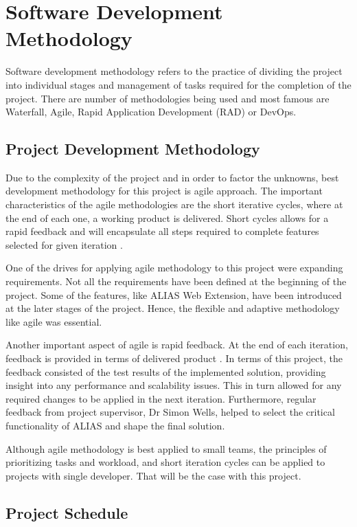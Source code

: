 \section{Software Development Methodology}
Software development methodology refers to the practice of dividing the project into individual stages and management of tasks required for the completion of the project. There are number of methodologies being used and most famous are Waterfall, Agile, Rapid Application Development (RAD) or DevOps. 

\subsection{Project Development Methodology}
Due to the complexity of the project and in order to factor the unknowns, best development methodology for this project is agile approach. The important characteristics of the agile methodologies are the short iterative cycles, where at the end of each one, a working product is delivered. Short cycles allows for a rapid feedback and will encapsulate all steps required to complete features selected for given iteration \citep{agile1}.

One of the drives for applying agile methodology to this project were expanding requirements. Not all the requirements have been defined at the beginning of the project. Some of the features, like ALIAS Web Extension, have been introduced at the later stages of the project. Hence, the flexible and adaptive methodology like agile was essential. 

Another important aspect of agile is rapid feedback. At the end of each iteration, feedback is provided in terms of delivered product \citep{agilebook}. In terms of this project, the feedback consisted of the test results of the implemented solution, providing insight into any performance and scalability issues. This in turn allowed for any required changes to be applied in the next iteration. Furthermore, regular feedback from project supervisor, Dr Simon Wells, helped to select the critical functionality of ALIAS and shape the final solution.

Although agile methodology is best applied to small teams, the principles of prioritizing tasks and workload, and short iteration cycles can be applied to projects with single developer. That will be the case with this project. 

\subsection{Project Schedule}

